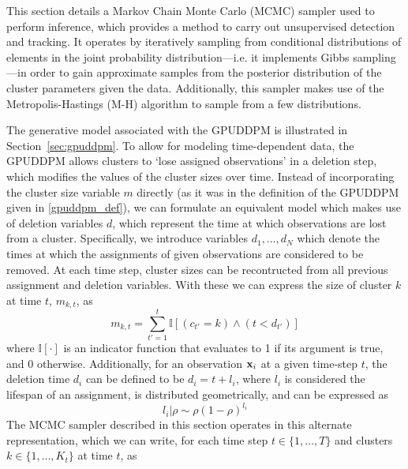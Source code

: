 \documentclass[smallcondensed, final]{svjour3}
\begin{document}
This section details a Markov Chain Monte Carlo (MCMC) sampler used to perform inference, which provides a method to carry out unsupervised detection and tracking. It operates by iteratively sampling from conditional distributions of elements in the joint probability distribution---i.e. it implements Gibbs sampling---in order to gain approximate samples from the posterior distribution of the cluster parameters given the data. Additionally, this sampler makes use of the Metropolis-Hastings (M-H) algorithm to sample from a few distributions.

The generative model associated with the GPUDDPM is illustrated in Section~\ref{sec:gpuddpm}. To allow for modeling time-dependent data, the GPUDDPM allows clusters to `lose assigned observations' in a deletion step, which modifies the values of the cluster sizes over time. Instead of incorporating the cluster size variable $m$ directly (as it was in the definition of the GPUDDPM given in \eqref{gpuddpm_def}), we can formulate an equivalent model which makes use of deletion variables $d$, which represent the time at which observations are lost from a cluster. Specifically, we introduce variables $d_{1}, \ldots, d_{N}$ which denote the times at which the assignments of given observations are considered to be removed. At each time step, cluster sizes can be recontructed from all previous assignment and deletion variables. With these we can express the size of cluster $k$ at time $t$, $m_{k,t}$, as
\begin{equation}
\label{compute_clust_size}
m_{k,t} = \sum_{t' = 1}^{t} \mathbb{I}[(c_{t'}=k) \wedge (t < d_{t'})]
\end{equation}
where $\mathbb{I}[\cdot]$ is an indicator function that evaluates to 1 if its argument is true, and 0 otherwise. Additionally, for an observation $\bold{x}_{i}$ at a given time-step $t$, the deletion time $d_{i}$ can be defined to be $d_{i} = t + l_{i}$, where $l_{i}$ is considered the lifespan of an assignment, is distributed geometrically, and can be expressed as
\begin{equation}
\label{del_rho_form}
l_{i} | \rho  \sim  \rho(1 - \rho)^{l_{i}}
\end{equation}
The MCMC sampler described in this section operates in this alternate representation, which we can write, for each time step $t \in \{1, \ldots, T\}$ and clusters $k \in \{ 1, \ldots, K_{t} \} $ at time $t$, as
\end{document}

